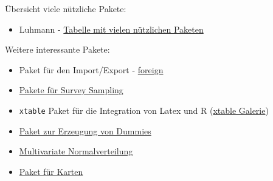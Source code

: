 \documentclass[ignorenonframetext,]{beamer}
\providecommand{\tightlist}{%
\setlength{\itemsep}{0pt}\setlength{\parskip}{0pt}}
\begin{document}
\begin{frame}[fragile]{Übersicht viele nützliche Pakete:}

\begin{itemize}
\tightlist
\item
  Luhmann -
  \href{http://www.beltz.de/fileadmin/beltz/downloads/OnlinematerialienPVU/28090_Luhmann/Verwendete\%20Pakete.pdf}{Tabelle
  mit vielen nützlichen Paketen}
\end{itemize}

\begin{block}{Weitere interessante Pakete:}

\begin{itemize}
\item
  Paket für den Import/Export -
  \href{http://cran.r-project.org/web/packages/foreign/foreign.pdf}{foreign}
\item
  \href{http://iase-web.org/documents/papers/icots8/ICOTS8_4J1_TILLE.pdf}{Pakete
  für Survey Sampling}
\item
  \texttt{xtable} Paket für die Integration von Latex und R
  (\href{http://cran.r-project.org/web/packages/xtable/vignettes/xtableGallery.pdf}{xtable
  Galerie})
\item
  \href{http://cran.r-project.org/web/packages/dummies/dummies.pdf}{Paket
  zur Erzeugung von Dummies}
\item
  \href{http://cran.r-project.org/web/packages/mvtnorm/index.html}{Multivariate
  Normalverteilung}
\item
  \href{http://www.r-bloggers.com/tag/maptools/}{Paket für Karten}
\end{itemize}

\end{block}

\end{frame}
\end{document}
